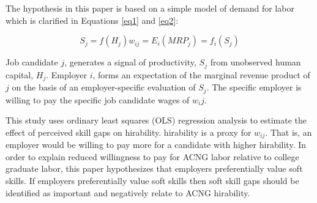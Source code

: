 \documentclass[review]{elsarticle}
\begin{document}

The hypothesis in this paper is based on a simple model of demand for labor which is clarified in Equations \ref{eq1} and \ref{eq2}:

\begin{subequations}
    \begin{equation}
        S_j = f(H_j)
        \label{eq1}
    \end{equation}
    \begin{equation}
        w_{ij} = E_i(MRP_j) = f_i(S_j)
        \label{eq2}
    \end{equation}
\end{subequations}

Job candidate $j$, generates a signal of productivity, $S_j$ from unobserved human capital, $H_j$.
Employer $i$, forms an expectation of the marginal revenue product of $j$ on the basis of an employer-specific evaluation of $S_j$.
The specific employer is willing to pay the specific job candidate wages of $w_ij$.

This study uses ordinary least squares (OLS) regression analysis to estimate the effect of perceived skill gaps on hirability.
hirability is a proxy for $w_{ij}$.
That is, an employer would be willing to pay more for a candidate with higher hirability.
In order to explain reduced willingness to pay for ACNG labor relative to college graduate labor,
this paper hypothesizes that employers preferentially value soft skills.
If employers preferentially value soft skills then soft skill gaps should be identified as important and negatively relate to ACNG hirability.
\end{document}
